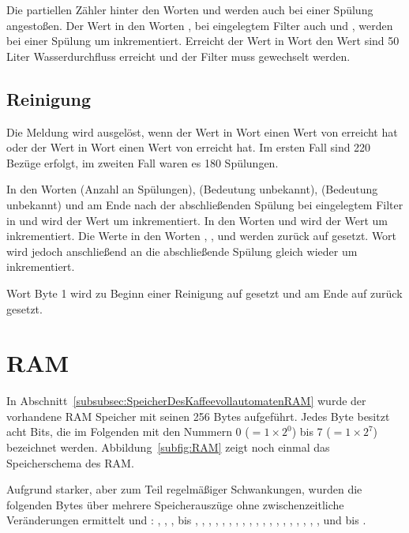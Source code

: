 Die partiellen Zähler hinter den Worten  und  werden auch bei einer Spülung angestoßen.
Der Wert in den Worten , bei eingelegtem Filter auch  und , werden bei einer Spülung um  inkrementiert.
Erreicht der Wert in Wort  den Wert  sind 50 Liter Wasserdurchfluss erreicht und der Filter muss gewechselt werden.

\subsection{Reinigung}
Die Meldung wird ausgelöst, wenn der Wert in Wort  einen Wert von  erreicht hat oder der Wert in Wort  einen Wert von  erreicht hat.
Im ersten Fall sind 220 Bezüge erfolgt, im zweiten Fall waren es 180 Spülungen.

In den Worten  (Anzahl an Spülungen),  (Bedeutung unbekannt),  (Bedeutung unbekannt) und am Ende nach der abschließenden Spülung bei eingelegtem Filter in  und  wird der Wert um  inkrementiert.
In den Worten  und  wird der Wert um  inkrementiert.
Die Werte in den Worten , ,  und  werden zurück auf  gesetzt.
Wort  wird jedoch anschließend an die abschließende Spülung gleich wieder um  inkrementiert.

Wort  Byte 1 wird zu Beginn einer Reinigung auf  gesetzt und am Ende auf  zurück gesetzt.

\section{RAM}\label{sec:ErgebnisseRAM}
In Abschnitt~\ref{subsubsec:SpeicherDesKaffeevollautomatenRAM} wurde der vorhandene \acf{RAM} Speicher mit seinen 256 Bytes aufgeführt.
Jedes Byte besitzt acht Bits, die im Folgenden mit den Nummern 0 ($=1\times 2^0$) bis 7 ($=1\times 2^7$) bezeichnet werden.
Abbildung~\ref{subfig:RAM} zeigt noch einmal das Speicherschema des \ac{RAM}.

Aufgrund starker, aber zum Teil regelmäßiger Schwankungen, wurden die folgenden Bytes über mehrere Speicherauszüge ohne zwischenzeitliche Veränderungen ermittelt und :
, , ,  bis , , , , , , , , , , , , , , , , , , ,  und  bis .

